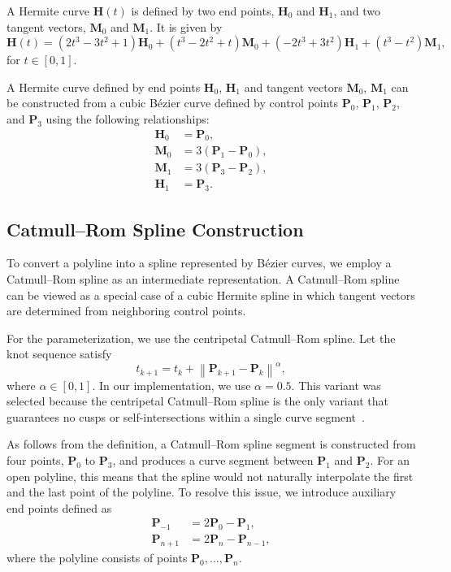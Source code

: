 A Hermite curve $\mathbf{H}(t)$ is defined by two end points, $\mathbf{H}_0$ and $\mathbf{H}_1$, and two tangent vectors, $\mathbf{M}_0$ and $\mathbf{M}_1$. It is given by
\begin{equation}
	\mathbf{H}(t) = (2t^3 - 3t^2 + 1)\mathbf{H}_0 + (t^3 - 2t^2 + t)\mathbf{M}_0 + (-2t^3 + 3t^2)\mathbf{H}_1 + (t^3 - t^2)\mathbf{M}_1,
\end{equation}
for $t \in [0,1]$.

A Hermite curve defined by end points $\mathbf{H}_0$, $\mathbf{H}_1$ and tangent vectors $\mathbf{M}_0$, $\mathbf{M}_1$ can be constructed from a cubic B\'ezier curve defined by control points $\mathbf{P}_0$, $\mathbf{P}_1$, $\mathbf{P}_2$, and $\mathbf{P}_3$ using the following relationships:
\begin{align}
	\mathbf{H}_0 &= \mathbf{P}_0, \\
	\mathbf{M}_0 &= 3\left(\mathbf{P}_1 - \mathbf{P}_0\right), \\
	\mathbf{M}_1 &= 3\left(\mathbf{P}_3 - \mathbf{P}_2\right), \\
	\mathbf{H}_1 &= \mathbf{P}_3.
\end{align}

\subsection{Catmull--Rom Spline Construction}

To convert a polyline into a spline represented by B\'ezier curves, we employ a Catmull--Rom spline as an intermediate representation. A Catmull--Rom spline can be viewed as a special case of a cubic Hermite spline in which tangent vectors are determined from neighboring control points.

For the parameterization, we use the centripetal Catmull--Rom spline. Let the knot sequence satisfy
\begin{equation}
	t_{k+1} = t_k + \left\lVert \mathbf{P}_{k+1} - \mathbf{P}_k \right\rVert^\alpha,
\end{equation}
where $\alpha \in [0,1]$. In our implementation, we use $\alpha = 0.5$. This variant was selected because the centripetal Catmull--Rom spline is the only variant that guarantees no cusps or self-intersections within a single curve segment~\cite{bk_catmull_rom_bezier}.


As follows from the definition, a Catmull--Rom spline segment is constructed from four points, $\mathbf{P}_0$ to $\mathbf{P}_3$, and produces a curve segment between $\mathbf{P}_1$ and $\mathbf{P}_2$. For an open polyline, this means that the spline would not naturally interpolate the first and the last point of the polyline. To resolve this issue, we introduce auxiliary end points defined as
\begin{align}
	\mathbf{P}_{-1} &= 2\mathbf{P}_0 - \mathbf{P}_1, \\
	\mathbf{P}_{n+1} &= 2\mathbf{P}_n - \mathbf{P}_{n-1},
\end{align}
where the polyline consists of points $\mathbf{P}_0, \dots, \mathbf{P}_n$.

